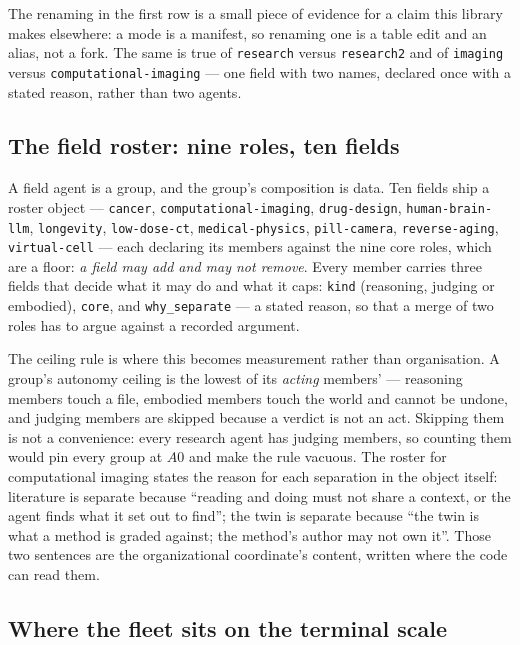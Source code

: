 \documentclass[11pt]{article}
\theoremstyle{definition}
\begin{document}
The renaming in the first row is a small piece of evidence for a claim this library makes elsewhere: a mode is a manifest, so renaming one is a table edit and an alias, not a fork. The same is true of \texttt{research} versus \texttt{research2} and of \texttt{imaging} versus \texttt{computational-\allowbreak imaging} --- one field with two names, declared once with a stated reason, rather than two agents.

\subsection{The field roster: nine roles, ten fields}\label{sec:fieldroster}

A field agent is a group, and the group's composition is data. Ten fields ship a roster object --- \texttt{cancer}, \texttt{computational-\allowbreak imaging}, \texttt{drug-design}, \texttt{human-brain-llm}, \texttt{longevity}, \texttt{low-dose-ct}, \texttt{medical-physics}, \texttt{pill-camera}, \texttt{reverse-aging}, \texttt{virtual-cell} --- each declaring its members against the nine core roles, which are a floor: \emph{a field may add and may not remove}. Every member carries three fields that decide what it may do and what it caps: \texttt{kind} (reasoning, judging or embodied), \texttt{core}, and \texttt{why\_separate} --- a stated reason, so that a merge of two roles has to argue against a recorded argument.

The ceiling rule is where this becomes measurement rather than organisation. A group's autonomy ceiling is the lowest of its \emph{acting} members' --- reasoning members touch a file, embodied members touch the world and cannot be undone, and judging members are skipped because a verdict is not an act. Skipping them is not a convenience: every research agent has judging members, so counting them would pin every group at $A0$ and make the rule vacuous. The roster for computational imaging states the reason for each separation in the object itself: literature is separate because ``reading and doing must not share a context, or the agent finds what it set out to find''; the twin is separate because ``the twin is what a method is graded against; the method's author may not own it''. Those two sentences are the organizational coordinate's content, written where the code can read them.

\subsection{Where the fleet sits on the terminal scale}
\end{document}
